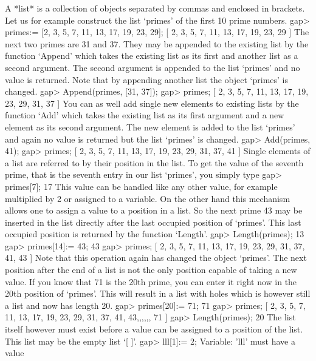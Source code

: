 A *list* is a collection of objects separated by  commas and enclosed  in
brackets.  Let us for example construct the list `primes' of the first 10
prime numbers.
\beginexample
gap> primes:= [2, 3, 5, 7, 11, 13, 17, 19, 23, 29];
[ 2, 3, 5, 7, 11, 13, 17, 19, 23, 29 ]
\endexample
The next two primes are  31 and 37.  They may be appended to the existing
list by the function `Append' which takes  the existing list as its first
and another list as a second argument.  The  second argument  is appended
to the list `primes' and  no  value is returned.  Note that  by appending
another list the object `primes' is changed.
\beginexample
gap> Append(primes, [31, 37]);
gap> primes;
[ 2, 3, 5, 7, 11, 13, 17, 19, 23, 29, 31, 37 ]
\endexample
You can as well add single new elements to existing lists by the function
`Add'  which takes  the existing list  as its  first argument  and  a new
element as  its second argument.  The  new  element  is added to the list
`primes' and again no value is returned but the list `primes' is changed.
\beginexample
gap> Add(primes, 41);
gap> primes;
[ 2, 3, 5, 7, 11, 13, 17, 19, 23, 29, 31, 37, 41 ]
\endexample
Single elements of a list are referred to by their position in the  list.
To get the value  of the seventh prime, that is the seventh entry in  our
list `primes', you simply type
\beginexample
gap> primes[7];
17
\endexample
This value can be handled like any other value, for example multiplied by 2
or assigned to a  variable. On the other hand  this mechanism allows one to
assign a value to  a position in  a  list. So the   next prime 43  may be
inserted  in the   list directly  after the  last   occupied position  of
`primes'. This  last occupied    position  is returned  by  the  function
`Length'.
\beginexample
gap> Length(primes);
13
gap> primes[14]:= 43;
43
gap> primes;
[ 2, 3, 5, 7, 11, 13, 17, 19, 23, 29, 31, 37, 41, 43 ]
\endexample
Note that this operation again has changed the object `primes'.  The
next position after the end of a list is not the only position capable
of taking a new value.  If you know that 71 is the 20th prime, you can
enter it right now in the 20th position of `primes'.  This will result
in a list with holes which is however still a list and now has length
20.
\beginexample
gap> primes[20]:= 71;
71
gap> primes;
[ 2, 3, 5, 7, 11, 13, 17, 19, 23, 29, 31, 37, 41, 43,,,,,, 71 ]
gap> Length(primes);
20
\endexample
The list itself however must  exist before a  value can be  assigned to a
position of the list.  This list may be the empty list `[ ]'.
\beginexample
gap> lll[1]:= 2;
Variable: 'lll' must have a value


